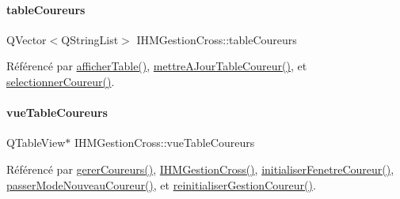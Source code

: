 \mbox{\label{class_i_h_m_gestion_cross_a9bf93b48403da7bf152f013055152630}} 
\paragraph{\texorpdfstring{table\+Coureurs}{tableCoureurs}}
{\footnotesize\ttfamily Q\+Vector$<$Q\+String\+List$>$ I\+H\+M\+Gestion\+Cross\+::table\+Coureurs\hspace{0.3cm}{\ttfamily [private]}}



Référencé par \hyperlink{class_i_h_m_gestion_cross_ae1510779a1efa3defecb517467e84f91}{afficher\+Table()}, \hyperlink{class_i_h_m_gestion_cross_a53c84315d723d75ad7b4a7d4c317efc5}{mettre\+A\+Jour\+Table\+Coureur()}, et \hyperlink{class_i_h_m_gestion_cross_ad71963d500fd61995fdae94e833db163}{selectionner\+Coureur()}.

\mbox{\label{class_i_h_m_gestion_cross_a4a0ba98c5b671a38d67942254d2329db}} 
\paragraph{\texorpdfstring{vue\+Table\+Coureurs}{vueTableCoureurs}}
{\footnotesize\ttfamily Q\+Table\+View$\ast$ I\+H\+M\+Gestion\+Cross\+::vue\+Table\+Coureurs\hspace{0.3cm}{\ttfamily [private]}}



Référencé par \hyperlink{class_i_h_m_gestion_cross_ad46a2295500cf98dbc18f862f6020103}{gerer\+Coureurs()}, \hyperlink{class_i_h_m_gestion_cross_a2c62fd83326a87456a403f46acc408c8}{I\+H\+M\+Gestion\+Cross()}, \hyperlink{class_i_h_m_gestion_cross_aa5d9de499a66e52b843c4ef4c6074a60}{initialiser\+Fenetre\+Coureur()}, \hyperlink{class_i_h_m_gestion_cross_ac8f336c95a5f0c9eb8a4bc1c4bb83445}{passer\+Mode\+Nouveau\+Coureur()}, et \hyperlink{class_i_h_m_gestion_cross_a85c44933ec0dcbb591e01c832063367e}{reinitialiser\+Gestion\+Coureur()}.

\mbox{\label{class_i_h_m_gestion_cross_a79b4e49cf8b22c9894d366e08b722c55}} 
